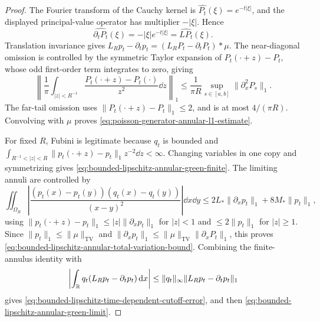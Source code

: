 \begin{proof}
The Fourier transform of the Cauchy kernel is
\(\widehat{P_t}(\xi)=e^{-t|\xi|}\), and the displayed principal-value
operator has multiplier \(-|\xi|\).  Hence
\[
\widehat{\partial_tP_t}(\xi)=-|\xi|e^{-t|\xi|}
=\widehat{LP_t}(\xi).
\]
Translation invariance gives
\(L_Rp_t-\partial_tp_t=(L_RP_t-\partial_tP_t)*\mu\).  The near-diagonal
omission is controlled by the symmetric Taylor expansion of
\(P_t(\cdot+z)-P_t\), whose odd first-order term integrates to zero, giving
\[
\left\|\frac1\pi\int_{|z|<R^{-1}}
\frac{P_t(\cdot+z)-P_t(\cdot)}{z^2}\dd z\right\|_1
\le \frac{1}{\pi R}\sup_{s\in[a,b]}\|\partial_x^2P_s\|_1 .
\]
The far-tail omission uses \(\|P_t(\cdot+z)-P_t\|_1\le2\), and is at most
\(4/(\pi R)\).  Convolving with \(\mu\) proves
\eqref{eq:poisson-generator-annular-l1-estimate}.

For fixed \(R\), Fubini is legitimate because \(q_t\) is bounded and
\(\int_{R^{-1}<|z|<R}\|p_t(\cdot+z)-p_t\|_1z^{-2}\dd z<\infty\).  Changing
variables in one copy and symmetrizing gives
\eqref{eq:bounded-lipschitz-annular-green-finite}.  The limiting annuli are
controlled by
\[
\iint_{\Omega_R}\left|
\frac{(p_t(x)-p_t(y))(q_t(x)-q_t(y))}{(x-y)^2}\right|\dd x\dd y
\le 2L_*\|\partial_xp_t\|_1+8M_*\|p_t\|_1 ,
\]
using \(\|p_t(\cdot+z)-p_t\|_1\le |z|\|\partial_xp_t\|_1\) for \(|z|<1\)
and \(\le2\|p_t\|_1\) for \(|z|\ge1\).  Since
\(\|p_t\|_1\le\|\mu\|_{\mathrm{TV}}\) and
\(\|\partial_xp_t\|_1\le\|\mu\|_{\mathrm{TV}}\|\partial_xP_t\|_1\), this proves
\eqref{eq:bounded-lipschitz-annular-total-variation-bound}.  Combining the
finite-annulus identity with
\[
\left|\int_{\mathbb{R}}q_t(L_Rp_t-\partial_tp_t)\,\mathrm{d} x\right|
\le \|q_t\|_\infty\|L_Rp_t-\partial_tp_t\|_1
\]
gives \eqref{eq:bounded-lipschitz-time-dependent-cutoff-error}, and then
\eqref{eq:bounded-lipschitz-annular-green-limit}.
\end{proof}


